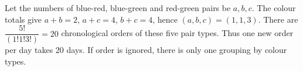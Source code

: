 Let the numbers of blue-red, blue-green and red-green pairs be $a,b,c$. The colour totals give $a+b=2$, $a+c=4$, $b+c=4$, hence $(a,b,c)=(1,1,3)$. There are $\dfrac{5!}{(1!1!3!)}=\boxed{20}$ chronological orders of these five pair types. Thus one new order per day takes 20 days. If order is ignored, there is only one grouping by colour types.
